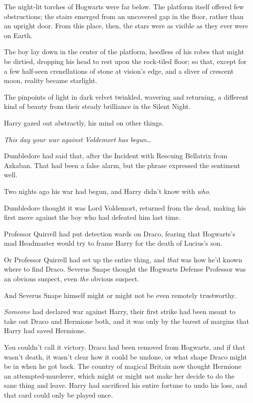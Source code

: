 The night-lit torches of Hogwarts were far below. The platform itself offered 
few obstructions; the stairs emerged from an uncovered gap in the floor, rather 
than an upright door. From this place, then, the stars were as visible as they 
ever were on Earth.

The boy lay down in the center of the platform, heedless of his robes that 
might be dirtied, dropping his head to rest upon the rock-tiled floor; so that, 
except for a few half-seen crenellations of stone at vision's edge, and a 
sliver of crescent moon, reality became starlight.

The pinpoints of light in dark velvet twinkled, wavering and returning, a 
different kind of beauty from their steady brilliance in the Silent Night.

Harry gazed out abstractly, his mind on other things.

\emph{This day your war against Voldemort has begun{\ldots}}

Dumbledore had said that, after the Incident with Rescuing Bellatrix from 
Azkaban. That had been a false alarm, but the phrase expressed the sentiment 
well.

Two nights ago his war had begun, and Harry didn't know with \emph{who}.

Dumbledore thought it was Lord Voldemort, returned from the dead, making his 
first move against the boy who had defeated him last time.

Professor Quirrell had put detection wards on Draco, fearing that Hogwarts's 
mad Headmaster would try to frame Harry for the death of Lucius's son.

Or Professor Quirrell had set up the entire thing, and \emph{that} was how he'd 
known where to find Draco. Severus Snape thought the Hogwarts Defense Professor 
was an obvious suspect, even \emph{the} obvious suspect.

And Severus Snape himself might or might not be even remotely trustworthy.

\emph{Someone} had declared war against Harry, their first strike had been 
meant to take out Draco and Hermione both, and it was only by the barest of 
margins that Harry had saved Hermione.

You couldn't call it victory. Draco had been removed from Hogwarts, and if that 
wasn't death, it wasn't clear how it could be undone, or what shape Draco might 
be in when he got back. The country of magical Britain now thought Hermione an 
attempted-murderer, which might or might not make her decide to do the sane 
thing and leave. Harry had sacrificed his entire fortune to undo his loss, and 
that card could only be played once.

